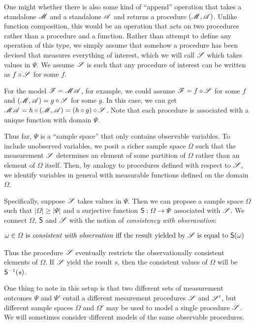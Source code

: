 One might whether there is also some kind of ``append'' operation that takes a standalone $\mathscr{M}$ and a standalone $\mathscr{A}$ and returns a procedure $(\mathscr{M},\mathscr{A})$. Unlike function composition, this would be an operation that acts on two procedures rather than a procedure and a function. Rather than attempt to define any operation of this type, we simply assume that somehow a procedure has been devised that measures everything of interest, which we will call $\mathscr{S}$ which takes values in $\Psi$. We assume $\mathscr{S}$ is such that any procedure of interest can be written as $f\circ \mathscr{S}$ for some $f$.

For the model $\mathscr{F}=\mathscr{MA}$, for example, we could assume $\mathscr{F}=f\circ \mathscr{S}$ for some $f$ and $(\mathscr{M},\mathscr{A})=g\circ \mathscr{S}$ for some $g$. In this case, we can get $\mathscr{MA}=h\circ(\mathscr{M},\mathscr{A})=(h\circ g)\circ\mathscr{S}$. Note that each procedure is associated with a unique function with domain $\Psi$.

Thus far, $\Psi$ is a ``sample space'' that only contains observable variables. To include unobserved variables, we posit a richer sample space $\Omega$ such that the measurement $\mathscr{S}$ determines an element of some partition of $\Omega$ rather than an element of $\Omega$ itself. Then, by analogy to procedures defined with respect to $\mathscr{S}$, we identify variables in general with measurable functions defined on the domain $\Omega$. 

Specifically, suppose $\mathscr{S}$ takes values in $\Psi$. Then we can propose a sample space $\Omega$ such that $|\Omega|\geq |\Psi|$ and a surjective function $\mathsf{S}:\Omega\to \Psi$ associated with $\mathscr{S}$. We connect $\Omega$, $\mathsf{S}$ and $\mathscr{S}$ with the notion of \emph{consistency with obseravation}:

\begin{align}
 &\omega\in \Omega\text{ is \emph{consistent with observation} iff the result yielded by }\mathscr{S}\text{ is equal to }\mathsf{S}(\omega)\label{def:observable}
\end{align}

Thus the procedure $\mathscr{S}$ eventually restricts the observationally consistent elements of $\Omega$. If $\mathscr{S}$ yield the result $s$, then the consistent values of $\Omega$ will be $\mathsf{S}^{-1}(s)$.

One thing to note in this setup is that two different sets of measurement outcomes $\Psi$ and $\Psi'$ entail a different mesurement procedures $\mathscr{S}$ and $\mathscr{S}'$, but different sample spaces $\Omega$ and $\Omega'$ may be used to model a single procedure $\mathscr{S}$. We will sometimes consider different models of the same observable procedures.

